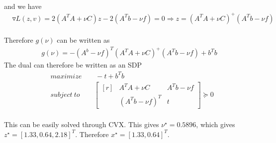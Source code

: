 \paragraph{}
and we have
\begin{align*}
&\triangledown L(z,v) = 2(A^TA + \nu C)z -2(A^Tb - \nu f) = 0 \Rightarrow  z = (A^TA+\nu C)^+(A^Tb-\nu f)
\end{align*}
\paragraph{}
Therefore $g(\nu)$ can be written as
\begin{align*}
g(\nu) = -(A^b-\nu f)^T(A^TA+\nu C)^+(A^Tb-\nu f) +b^Tb
\end{align*}{}
The dual can therefore be written as an SDP
\begin{align*}
&maximize \qquad -t +b^Tb\\
&subject\ to \qquad \begin{bmatrix*}[r]
&A^TA +\nu C &A^Tb- \nu f \\&(A^Tb-\nu f)^T &t 
\end{bmatrix*}\succeq 0
\end{align*}
\paragraph{}
This can be easily solved through CVX. This gives $\nu^{\star} =0.5896$, which gives $z^{\star} = [1.33, 0.64, 2.18]^T$. Therefore $x^{\star} = [1.33, 0.64]^T$.